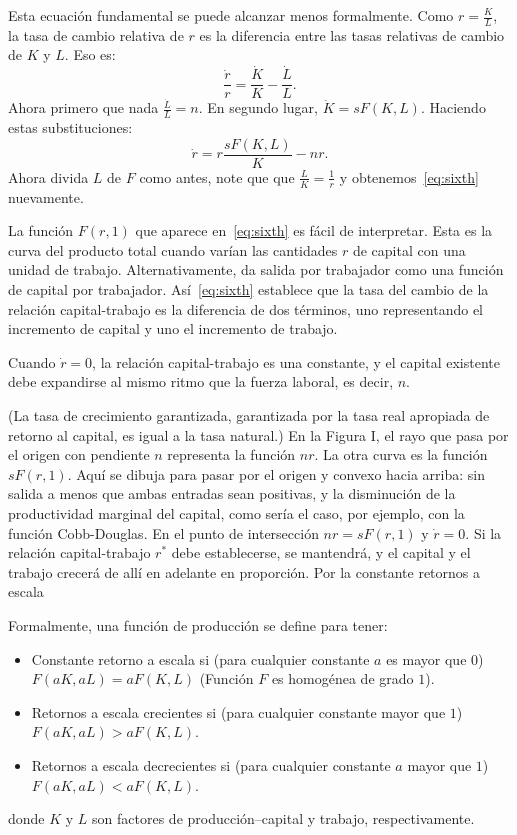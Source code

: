 Esta ecuación fundamental se puede alcanzar menos formalmente. Como $r=\frac{K}{L}$, la tasa de cambio relativa de $r$ es la diferencia entre las tasas relativas de cambio de $K$ y $L$. Eso es: \[ \frac{\dot{r}}{r}=\frac{\dot{K}}{K}-\frac{\dot{L}}{L}. \] Ahora primero que nada $\frac{\dot{L}}{L}=n$. En segundo lugar, $\dot{K}=sF\left(K,L\right)$. Haciendo estas substituciones: \[ \dot{r}=r\frac{sF\left(K,L\right)}{K}-nr. \] Ahora divida $L$ de $F$ como antes, note que que $\frac{L}{K}=\frac{1}{r}$ y obtenemos~\eqref{eq:sixth} nuevamente.

La función $F\left(r,1\right)$ que aparece en~\eqref{eq:sixth} es fácil de interpretar. Esta es la curva del producto total cuando varían las cantidades $r$ de capital con una unidad de trabajo. Alternativamente, da salida por trabajador como una función de capital por trabajador. Así~\eqref{eq:sixth} establece que la tasa del cambio de la relación capital-trabajo es la diferencia de dos términos, uno representando el incremento de capital y uno el incremento de trabajo.

Cuando $\dot{r}=0$, la relación capital-trabajo es una constante, y el capital existente debe expandirse al mismo ritmo que la fuerza laboral, es decir, $n$.

(La tasa de crecimiento garantizada, garantizada por la tasa real apropiada de retorno al capital, es igual a la tasa natural.) En la Figura I, el rayo que pasa por el origen con pendiente $n$ representa la función $nr$. La otra curva es la función $sF\left(r,1\right)$. Aquí se dibuja para pasar por el origen y convexo hacia arriba: sin salida a menos que ambas entradas sean positivas, y la disminución de la productividad marginal del capital, como sería el caso, por ejemplo, con la función Cobb-Douglas. En el punto de intersección $nr=sF\left(r,1\right)$ y $\dot{r}=0$. Si la relación capital-trabajo $r^{\ast}$ debe establecerse, se mantendrá, y el capital y
el trabajo crecerá de allí en adelante en proporción. Por la constante retornos a escala

\newpage
Formalmente, una función de producción se define para tener:
\begin{itemize}
	\item Constante retorno a escala si (para cualquier constante $a$ es mayor que $0$) $F\left(aK,aL\right)=aF\left(K,L\right)$ (Función $F$ es homogénea de grado $1$).
	\item Retornos a escala crecientes si (para cualquier constante mayor que $1$) $F\left(aK,aL\right)>aF\left(K,L\right)$.
	\item Retornos a escala decrecientes si (para cualquier constante $a$ mayor que $1$) $F\left(aK,aL\right)<aF\left(K,L\right)$.
\end{itemize}
donde $K$ y $L$ son factores de producción--capital y trabajo, respectivamente.


